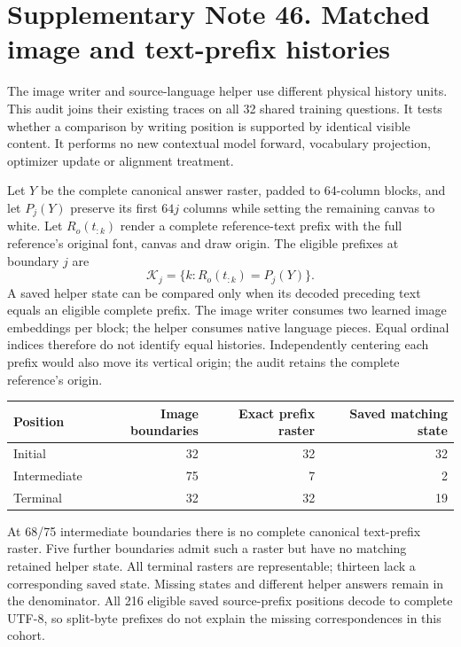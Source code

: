 \documentclass[10pt,a4paper]{article}
\begin{document}
\clearpage
\section*{Supplementary Note 46. Matched image and text-prefix histories}

The image writer and source-language helper use different physical history
units. This audit joins their existing traces on all 32 shared training
questions. It tests whether a comparison by writing position is supported
by identical visible content. It performs no new contextual model forward,
vocabulary projection, optimizer update or alignment treatment.

Let $Y$ be the complete canonical answer raster, padded to 64-column blocks,
and let $P_j(Y)$ preserve its first $64j$ columns while setting the remaining
canvas to white. Let $R_o(t_{:k})$ render a complete reference-text prefix
with the full reference's original font, canvas and draw origin. The
eligible prefixes at boundary $j$ are
\[
 \mathcal K_j=\{k:R_o(t_{:k})=P_j(Y)\}.
\]
A saved helper state can be compared only when its decoded preceding text
equals an eligible complete prefix. The image writer consumes two learned
image embeddings per block; the helper consumes native language pieces.
Equal ordinal indices therefore do not identify equal histories.
Independently centering each prefix would also move its vertical origin;
the audit retains the complete reference's origin.

\begin{center}\small
\begin{tabular}{lrrr}
\toprule
Position & Image boundaries & Exact prefix raster & Saved matching state\\
\midrule
Initial & 32 & 32 & 32\\
Intermediate & 75 & 7 & 2\\
Terminal & 32 & 32 & 19\\
\bottomrule
\end{tabular}
\end{center}
At 68/75 intermediate boundaries there is no complete canonical text-prefix
raster. Five further boundaries admit such a raster but have no matching
retained helper state. All terminal rasters are representable; thirteen
lack a corresponding saved state. Missing states and different helper
answers remain in the denominator. All 216 eligible saved source-prefix
positions decode to complete UTF-8, so split-byte prefixes do not explain
the missing correspondences in this cohort.
\end{document}
